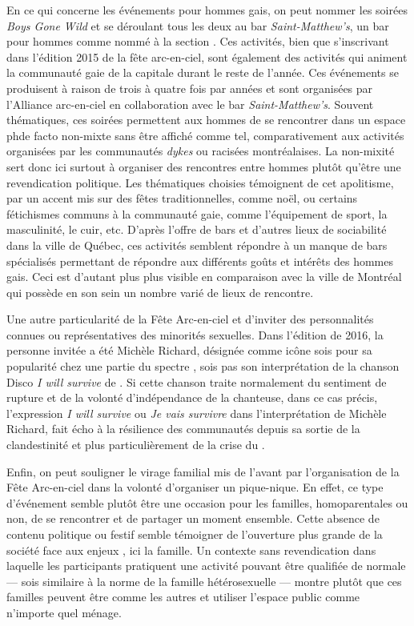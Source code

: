 En ce qui concerne les événements pour hommes gais, on peut nommer les soirées \emph{Boys Gone Wild} et  se déroulant tous les deux au bar \emph{Saint-Matthew's}, un bar pour hommes comme nommé à la section .
Ces activités, bien que s'inscrivant dans l'édition 2015 de la fête arc-en-ciel, sont également des activités qui animent la communauté gaie de la capitale durant le reste de l'année.
Ces événements se produisent à raison de trois à quatre fois par années et sont organisées par l'Alliance arc-en-ciel en collaboration avec le bar \emph{Saint-Matthew's}.
Souvent thématiques, ces soirées permettent aux hommes de se rencontrer dans un espace \e ph{de facto} non-mixte sans être affiché comme tel, comparativement aux activités organisées par les communautés \emph{dykes} ou racisées montréalaises.
La non-mixité sert donc ici surtout à organiser des rencontres entre hommes plutôt qu'être une revendication politique.
Les thématiques choisies témoignent de cet apolitisme, par un accent mis sur des fêtes traditionnelles, comme noël, ou certains fétichismes communs à la communauté gaie, comme l'équipement de sport, la masculinité, le cuir, etc.
D'après l'offre de bars et d'autres lieux de sociabilité dans la ville de Québec, ces activités semblent répondre à un manque de bars spécialisés permettant de répondre aux différents goûts et intérêts des hommes gais.
Ceci est d'autant plus plus visible en comparaison avec la ville de Montréal qui possède en son sein un nombre varié de lieux de rencontre.


Une autre particularité de la Fête Arc-en-ciel et d'inviter des personnalités connues ou représentatives des minorités sexuelles.
Dans l'édition de 2016, la personne invitée a été Michèle Richard, désignée comme icône sois pour sa popularité chez une partie du spectre \lgbt{}, sois pas son interprétation de la chanson Disco \emph{I will survive} de .
Si cette chanson traite normalement du sentiment de rupture et de la volonté d'indépendance de la chanteuse, dans ce cas précis, l'expression \emph{I will survive} ou \emph{Je vais survivre} dans l'interprétation de Michèle Richard, fait écho à la résilience des communautés \lgbt depuis sa sortie de la clandestinité et plus particulièrement de la crise du \vih{}.

Enfin, on peut souligner le virage familial mis de l'avant par l'organisation de la Fête Arc-en-ciel dans la volonté d'organiser un pique-nique.
En effet, ce type d'événement semble plutôt être une occasion pour les familles, homoparentales ou non, de se rencontrer et de partager un moment ensemble.
Cette absence de contenu politique ou festif semble témoigner de l'ouverture plus grande de la société face aux enjeux \lgbt, ici la famille.
Un contexte sans revendication dans laquelle les participants pratiquent une activité pouvant être qualifiée de normale --- sois similaire à la norme de la famille hétérosexuelle --- montre plutôt que ces familles peuvent être comme les autres et utiliser l'espace public comme n'importe quel ménage.

